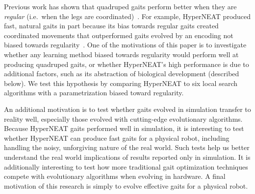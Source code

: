 Previous work has shown that quadruped gaits perform better when they
are \emph{regular} (i.e.\ when the legs are
coordinated)~\citep{clune2009evolving,
  clune2011performance,valsalam2008modular}. For example, HyperNEAT
produced fast, natural gaits in part because its bias towards regular
gaits created coordinated movements that outperformed gaits evolved by
an encoding not biased towards regularity~\citep{clune2009evolving,
  clune2011performance}. One of the motivations of this paper is to
investigate whether any learning method biased towards regularity
would perform well at producing quadruped gaits, or whether
HyperNEAT's high performance is due to additional factors, such as its
abstraction of biological development (described below). We test this
hypothesis by comparing HyperNEAT to six local search algorithms with
a parametrization biased toward regularity.

An additional motivation is to test whether gaits evolved in simulation transfer to reality well, especially those evolved with cutting-edge evolutionary algorithms. Because HyperNEAT gaits performed well in
simulation, it is interesting to test whether HyperNEAT can produce fast
gaits for a physical robot, including handling the noisy, unforgiving nature of the real world. Such tests help us better understand the real world implications of results reported only in simulation. It is additionally interesting to test how
more traditional gait optimization techniques compete with
evolutionary algorithms when evolving in hardware. A final motivation of this research is simply to evolve effective gaits for a physical robot.




%  
%  
% 

